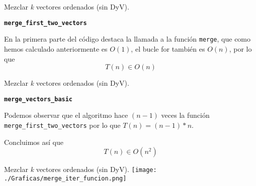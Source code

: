 \documentclass[10pt, xcolor=table]{beamer}
\begin{document}
\begin{frame}[fragile]{Mezclar \textit{k} vectores ordenados (sin DyV). }

\begin{center}
	\textbf{\large{\texttt{merge\_first\_two\_vectors}}}
\end{center}

En la primera parte del código destaca la llamada a la función \texttt{merge}, que como hemos calculado anteriormente es $O(1)$, el bucle for también es $O(n)$, por lo que 
$$T(n) \in O(n)$$

\end{frame}

\begin{frame}[fragile]{Mezclar \textit{k} vectores ordenados (sin DyV). }
\begin{center}
	\textbf{\large{\texttt{merge\_vectors\_basic}}}
\end{center}

Podemos observar que el algoritmo hace $(n-1)$ veces la función \texttt{merge\_first\_two\_vectors} por lo que $T(n) = (n-1)*n$. 

Concluimos así que
$$T(n) \in O(n^2)$$

\end{frame}



\begin{frame}[fragile]{Mezclar \textit{k} vectores ordenados (sin DyV). }
\texttt{[image: ./Graficas/merge\_iter\_funcion.png]}
\end{frame}
\end{document}
